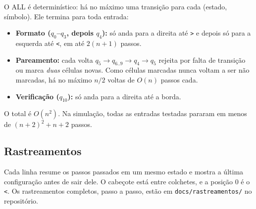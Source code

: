 \documentclass[11pt,a4paper]{article}
\newcommand{\cad}[1]{\texttt{#1}}       %
\begin{document}
O ALL é determinístico: há no máximo uma transição para cada (estado, símbolo). Ele termina para toda entrada:
\begin{itemize}
  \item \textbf{Formato ($q_0$--$q_3$, depois $q_4$):} só anda para a direita até \cad{>} e depois só para a esquerda até \cad{<}, em até $2(n+1)$ passos.
  \item \textbf{Pareamento:} cada volta $q_5\to q_{6..9}\to q_4\to q_5$ rejeita por falta de transição ou marca \emph{duas} células novas. Como células marcadas nunca voltam a ser não marcadas, há no máximo $n/2$ voltas de $O(n)$ passos cada.
  \item \textbf{Verificação ($q_{10}$):} só anda para a direita até a borda.
\end{itemize}
O total é $O(n^2)$. Na simulação, todas as entradas testadas pararam em menos de $(n+2)^2+n+2$ passos.

\subsection{Rastreamentos}

Cada linha resume os passos passados em um mesmo estado e mostra a última configuração antes de sair dele. O cabeçote está entre colchetes, e a posição 0 é o \cad{<}. Os rastreamentos completos, passo a passo, estão em \texttt{docs/rastreamentos/} no repositório.
\end{document}
